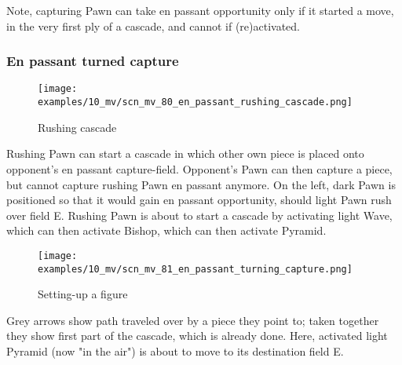 Note, capturing Pawn can take en passant opportunity only if it started a move,
in the very first ply of a cascade, and cannot if (re)activated.

\clearpage %

\subsubsection*{En passant turned capture}
\label{sec:Miranda's veil/Wave/En passant/En passant turned capture}

\vspace*{-0.7\baselineskip}
\noindent
\begin{wrapfigure}[15]{l}{0.4\textwidth}
\centering
\texttt{[image: examples/10\_mv/scn\_mv\_80\_en\_passant\_rushing\_cascade.png]}
\vspace*{-1.4\baselineskip}
\caption{Rushing cascade}
\label{fig:scn_mv_80_en_passant_rushing_cascade}
\end{wrapfigure}
Rushing Pawn can start a cascade in which other own piece is placed onto opponent's
en passant capture-field.
Opponent's Pawn can then capture a piece, but cannot capture rushing Pawn en passant
anymore.\newline
\indent
On the left, dark Pawn is positioned so that it would gain en passant opportunity,
should light Pawn rush over field E. Rushing Pawn is about to start a cascade by
activating light Wave, which can then activate Bishop, which can then activate
Pyramid.


\noindent
\begin{wrapfigure}[7]{l}{0.4\textwidth}
\centering
\texttt{[image: examples/10\_mv/scn\_mv\_81\_en\_passant\_turning\_capture.png]}
\vspace*{-1.4\baselineskip}
\caption{Setting-up a figure}
\label{fig:scn_mv_81_en_passant_turning_capture}
\end{wrapfigure}
Grey arrows show path traveled over by a piece they point to; taken together they
show first part of the cascade, which is already done.\newline
\indent
Here, activated light Pyramid (now "in the air") is about to move to its destination
field E.

